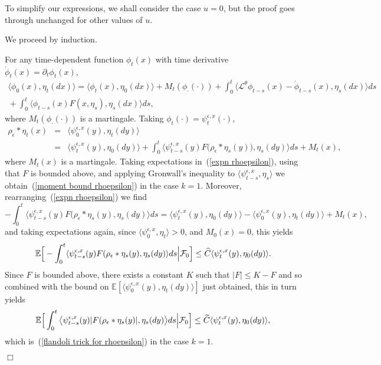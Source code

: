 \documentclass[12pt]{article}
\newenvironment {proof}{{\noindent\bf Proof }}{\hfill $\Box$ \medskip}
\newcommand{\IE}{\mathbb E}
\numberwithin{equation}{section}
\begin{document}
\begin{proof}
To simplify our expressions, we shall consider the case $u=0$, but
the proof goes through unchanged for other values of $u$.

We proceed by induction. 

For any time-dependent function $\phi_t(x)$
with time derivative $\dot \phi_t(x) = \partial_t \phi_t(x)$,
\begin{multline}
\label{time dep mg prob}
    \langle \phi_0(x), \eta_t(dx) \rangle
    = 
    \langle \phi_t(x), \eta_0(dx) \rangle
    +
    M_t(\phi_\cdot(\cdot))
    +
    \int_0^t \big\langle \mathcal{L}^\theta \phi_{t-s}(x) 
- \dot \phi_{t-s}(x), \eta_s(dx) \big\rangle ds
    \\  {}
    +
 \int_{0}^t \big\langle \phi_{t-s}(x) F(x, \eta_s) , \eta_s(dx) \big\rangle ds ,
\end{multline}
where $M_t(\phi_\cdot(\cdot))$ is a martingale. 
Taking $\phi_t(\cdot)=\psi_t^{\epsilon,x}(\cdot)$,
\begin{eqnarray}
\nonumber
\rho_\epsilon*\eta_t(x)&=&\langle\psi^{\epsilon,x}_0(y),\eta_t(dy)\rangle
\\
&=&\langle\psi^{\epsilon,x}_t(y),\eta_0(dy)\rangle
+\int_0^t\big\langle\psi^{\epsilon,x}_{t-s}(y)
F\big(\rho_\epsilon*\eta_s(y)\big), \eta_s(dy)\big\rangle ds
+M_t(x),
\label{expn rhoepsilon}
\end{eqnarray}
where $M_t(x)$ is a martingale. 
Taking expectations in~(\ref{expn rhoepsilon}), using that $F$ is bounded above, and 
applying Gronwall's inequality to 
$\langle\psi^{\epsilon,x}_{t-s}, \eta_s\rangle$ 
we obtain~(\ref{moment bound rhoepsilon})
in the case $k=1$. 
Moreover, rearranging~(\ref{expn rhoepsilon}) we find 
\begin{equation}
-\int_0^t\big\langle\psi^{\epsilon,x}_{t-s}(y)
F(\rho_\epsilon*\eta_s(y), \eta_s(dy)\big\rangle ds
=\langle\psi^{\epsilon,x}_t(y),\eta_0(dy)\rangle
-\langle \psi^{\epsilon,x}_0(y),\eta_t(dy)\rangle +M_t(x),
\end{equation} 
and taking expectations again, 
since $\langle\psi^{\epsilon,x}_0,\eta_t\rangle>0$, and $M_0(x)=0$,
this yields 
$$\IE\Big[-\int_0^t\langle\psi^{\epsilon,x}_{t-s}(y)F(\rho_\epsilon*\eta_s(y), 
\eta_s(dy)\rangle ds\Big|{\cal F}_0\Big]
\leq \widehat{C}\langle\psi^{\epsilon, x}_t(y),\eta_0(dy)\rangle.$$
Since $F$ is bounded above, there exists a constant $K$ such that $|F|\leq K-F$ and so 
combined with the bound on $\IE[\langle\psi^{\epsilon, x}_0(y),\eta_t(dy)\rangle]$ just
obtained, this in turn yields 
$$\IE\Big[\int_0^t\big\langle\psi^{\epsilon,x}_{t-s}(y)
|F(\rho_\epsilon*\eta_s(y)|, 
\eta_s(dy)\big\rangle ds\Big|{\cal F}_0\Big]\leq 
\widetilde{C}\langle\psi^{\epsilon, x}_t(y),\eta_0(dy)\rangle,$$
which is~(\ref{flandoli trick for rhoepsilon})
in the case $k=1$.


\end{proof}
\end{document}
